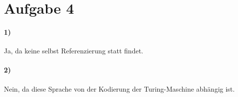 \section*{Aufgabe 4}

\paragraph*{1)} Ja, da keine selbst Referenzierung statt findet.

\paragraph*{2)} Nein, da diese Sprache von der Kodierung der Turing-Maschine abhängig ist.


